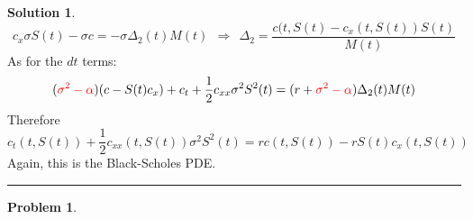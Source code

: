 \documentclass[a4paper, 10pt]{article}
\theoremstyle{definition}
\newtheorem{problem}{Problem}
\theoremstyle{hSol}
\newtheorem*{solution}{Solution}
\begin{document}
\begin{solution}
\begin{equation}
	c_x\sigma S(t)- \sigma c = -\sigma\Delta_2(t) M(t)~~\Rightarrow~~\Delta_2 = \frac{c(t,S(t)-c_x(t,S(t))S(t)}{M(t)}
\end{equation}
As for the $dt$ terms:
\begin{equation}
	(\textcolor{red}{\sigma^2- \alpha}) (c-S(t) c_x) + c_t + \frac{1}{2}c_{xx}\sigma^2 S^2(t) = (r+\textcolor{red}{\sigma^2- \alpha})\Delta_2(t)M(t)
\end{equation}
Therefore
\begin{equation}
	c_t(t,S(t)) + \frac{1}{2}c_{xx}(t,S(t))\sigma^2 S^2(t) = rc(t,S(t)) - rS(t) c_x(t,S(t))
\end{equation}
Again, this is the Black-Scholes PDE.
\end{solution}

\newpage


\noindent\rule{16cm}{0.4pt}
\begin{problem} 
\end{problem}
\end{document}
